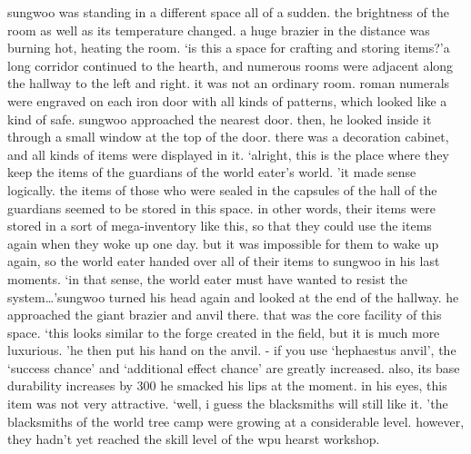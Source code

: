 sungwoo was standing in a different space all of a sudden.
 the brightness of the room as well as its temperature changed.
 a huge brazier in the distance was burning hot, heating the room.
‘is this a space for crafting and storing items?’a long corridor continued to the hearth, and numerous rooms were adjacent along the hallway to the left and right.
 it was not an ordinary room.
 roman numerals were engraved on each iron door with all kinds of patterns, which looked like a kind of safe.
sungwoo approached the nearest door.
 then, he looked inside it through a small window at the top of the door.
 there was a decoration cabinet, and all kinds of items were displayed in it.
‘alright, this is the place where they keep the items of the guardians of the world eater’s world.
’it made sense logically.
 the items of those who were sealed in the capsules of the hall of the guardians seemed to be stored in this space.
in other words, their items were stored in a sort of mega-inventory like this, so that they could use the items again when they woke up one day.
 but it was impossible for them to wake up again, so the world eater handed over all of their items to sungwoo in his last moments.
‘in that sense, the world eater must have wanted to resist the system…’sungwoo turned his head again and looked at the end of the hallway.
 he approached the giant brazier and anvil there.
 that was the core facility of this space.
‘this looks similar to the forge created in the field, but it is much more luxurious.
’he then put his hand on the anvil.
- if you use ‘hephaestus anvil’, the ‘success chance’ and ‘additional effect chance’ are greatly increased.
 also, its base durability increases by 300%
he smacked his lips at the moment.
 in his eyes, this item was not very attractive.
‘well, i guess the blacksmiths will still like it.
’the blacksmiths of the world tree camp were growing at a considerable level.
 however, they hadn’t yet reached the skill level of the wpu hearst workshop.

